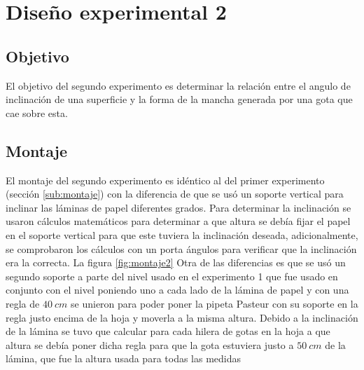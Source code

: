 \section{Diseño experimental 2} \label{sec:Diseño experimental 2}
\subsection{Objetivo} \label{sub:objetivo2} El objetivo del segundo experimento
es determinar la relación entre el angulo de inclinación de una superficie y la
forma de la mancha generada por una gota que cae sobre esta.

\subsection{Montaje} \label{sub:montaje2} El montaje del segundo experimento es
idéntico al del primer experimento (sección \ref{sub:montaje}) con la
diferencia de que se usó un soporte vertical para inclinar las láminas de papel
diferentes grados. Para determinar la inclinación se usaron cálculos
matemáticos para determinar a que altura se debía fijar el papel en el soporte
vertical para que este tuviera la inclinación deseada, adicionalmente, se
comprobaron los cálculos con un porta ángulos para verificar que la inclinación
era la correcta. La figura \ref{fig:montaje2} Otra de las diferencias es que se
usó un segundo soporte a parte del nivel usado en el experimento 1 que fue
usado en conjunto con el nivel poniendo uno a cada lado de la lámina de papel y
con una regla de $40\ cm$ se unieron para poder poner la pipeta Pasteur con su
soporte en la regla justo encima de la hoja y moverla a la misma altura. Debido
a la inclinación de la lámina se tuvo que calcular para cada hilera de gotas en
la hoja a que altura se debía poner dicha regla para que la gota estuviera
justo a $50\ cm$ de la lámina, que fue la altura usada para todas las medidas
